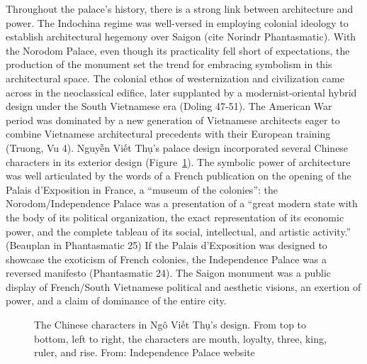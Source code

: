Throughout the palace's history, there is a strong link between architecture and power. The Indochina regime was well-versed in employing colonial ideology to establish architectural hegemony over Saigon (cite Norindr Phantasmatic). With the Norodom Palace, even though its practicality fell short of expectations, the production of the monument set the trend for embracing symbolism in this architectural space. The colonial ethos of westernization and civilization came across in the neoclassical edifice, later supplanted by a modernist-oriental hybrid design under the South Vietnamese era (Doling 47-51). The American War period was dominated by a new generation of Vietnamese architects eager to combine Vietnamese architectural precedents with their European training (Truong, Vu 4). Nguyễn Viết Thụ’s palace design incorporated several Chinese characters in its exterior design (Figure~\ref{palace_chinese}). The symbolic power of architecture was well articulated by the words of a French publication on the opening of the Palais d’Exposition in France, a “museum of the colonies”: the Norodom/Independence Palace was a presentation of a “great modern state with the body of its political organization, the exact representation of its economic power, and the complete tableau of its social, intellectual, and artistic activity.” (Beauplan in Phantasmatic 25) If the Palais d’Exposition was designed to showcase the exoticism of French colonies, the Independence Palace was a reversed manifesto (Phantasmatic 24). The Saigon monument was a public display of French/South Vietnamese political and aesthetic visions, an exertion of power, and a claim of dominance of the entire city. \en

\begin{figure}[!ht]
\begin{center}
\vspace{-.2 in}
\caption{\vi The Chinese characters in Ngô Viết Thụ's design. From top to bottom, left to right, the characters are mouth, loyalty, three, king, ruler, and rise. From: Independence Palace website \en}\label{palace_chinese}
\end{center}
\vspace{-.2 in}
\end{figure}

